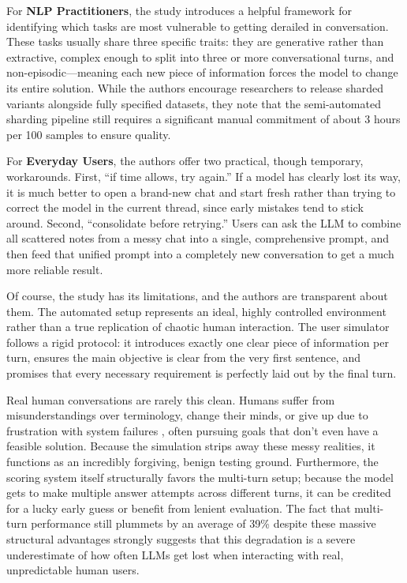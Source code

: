 \documentclass[manuscript,review]{acmart}
\begin{document}
For \textbf{NLP Practitioners}, the study introduces a helpful framework for identifying which tasks are most vulnerable to getting derailed in conversation. These tasks usually share three specific traits: they are generative rather than extractive, complex enough to split into three or more conversational turns, and non-episodic—meaning each new piece of information forces the model to change its entire solution. While the authors encourage researchers to release sharded variants alongside fully specified datasets, they note that the semi-automated sharding pipeline still requires a significant manual commitment of about 3 hours per 100 samples to ensure quality.

For \textbf{Everyday Users}, the authors offer two practical, though temporary, workarounds. First, ``if time allows, try again.'' If a model has clearly lost its way, it is much better to open a brand-new chat and start fresh rather than trying to correct the model in the current thread, since early mistakes tend to stick around. Second, ``consolidate before retrying.'' Users can ask the LLM to combine all scattered notes from a messy chat into a single, comprehensive prompt, and then feed that unified prompt into a completely new conversation to get a much more reliable result.

Of course, the study has its limitations, and the authors are transparent about them. The automated setup represents an ideal, highly controlled environment rather than a true replication of chaotic human interaction. The user simulator follows a rigid protocol: it introduces exactly one clear piece of information per turn, ensures the main objective is clear from the very first sentence, and promises that every necessary requirement is perfectly laid out by the final turn. 

Real human conversations are rarely this clean. Humans suffer from misunderstandings over terminology, change their minds, or give up due to frustration with system failures \cite{wester2024giving}, often pursuing goals that don't even have a feasible solution. Because the simulation strips away these messy realities, it functions as an incredibly forgiving, benign testing ground. Furthermore, the scoring system itself structurally favors the multi-turn setup; because the model gets to make multiple answer attempts across different turns, it can be credited for a lucky early guess or benefit from lenient evaluation. The fact that multi-turn performance still plummets by an average of 39\% despite these massive structural advantages strongly suggests that this degradation is a severe underestimate of how often LLMs get lost when interacting with real, unpredictable human users.
\end{document}

